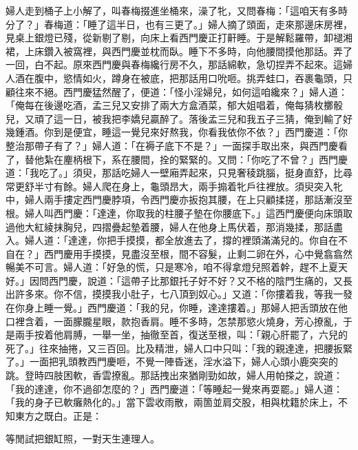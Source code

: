 婦人走到桶子上小解了，叫春梅掇進坐桶來，澡了牝，又問春梅：「這咱天有多時分了？」春梅道：「睡了這半日，也有三更了。」婦人摘了頭面，走來那邊床房裡，見桌上銀燈已殘，從新剔了剔，向床上看西門慶正打鼾睡。于是解鬆羅帶，卸褪湘裙，上床鑽入被窩裡，與西門慶並枕而臥。睡下不多時，向他腰間摸他那話。弄了一回，白不起。原來西門慶與春梅纔行房不久，那話綿軟，急切捏弄不起來。這婦人酒在腹中，慾情如火，蹲身在被底，把那話用口吮咂。挑弄蛙口，吞裹龜頭，只顧往來不絕。西門慶猛然醒了，便道：「怪小淫婦兒，如何這咱纔來？」婦人道：「俺每在後邊吃酒，孟三兒又安排了兩大方盒酒菜，郁大姐唱着，俺每猜枚擲骰兒，又頑了這一日，被我把李嬌兒贏醉了。落後孟三兒和我五子三猜，俺到輸了好幾鍾酒。你到是便宜，睡這一覺兒來好熬我，你看我依你不依？」{}西門慶道：「你整治那帶子有了？」婦人道：「在褥子底下不是？」一面探手取出來，與西門慶看了，替他紮在麈柄根下，系在腰間，拴的緊緊的。又問：「你吃了不曾？」西門慶道：「我吃了。」須臾，那話吃婦人一壁廂弄起來，{}只見奢稜跳腦，挺身直舒，比尋常更舒半寸有餘。婦人爬在身上，龜頭昂大，兩手搧着牝戶往裡放。須臾突入牝中，婦人兩手摟定西門慶脖項，令西門慶亦扳抱其腰，在上只顧揉搓，那話漸沒至根。婦人叫西門慶：「達達，你取我的柱腰子墊在你腰底下。」這西門慶便向床頭取過他大紅綾抹胸兒，四摺疊起墊着腰，婦人在他身上馬伏着，那消幾揉，那話盡入。婦人道：「達達，你把手摸摸，都全放進去了，撐的裡頭滿滿兒的。你自在不自在？」西門慶用手摸摸，見盡沒至根，間不容髮，止剩二卵在外，心中覺翕翕然暢美不可言。婦人道：「好急的慌，只是寒冷，咱不得拿燈兒照着幹，趕不上夏天好。」因問西門慶，說道：「這帶子比那銀托子好不好？又不格的陰門生痛的，又長出許多來。你不信，摸摸我小肚子，七八頂到奴心。」又道：「你摟着我，等我一發在你身上睡一覺。」西門慶道：「我的兒，你睡，達達摟着。」那婦人把舌頭放在他口裡含着，一面朦朧星眼，款抱香肩。睡不多時，怎禁那慾火燒身，芳心撩亂，于是兩手按着他肩膊，一舉一坐，抽徹至首，復送至根，叫：「親心肝罷了，六兒的死了。」往來抽捲，又三百回。比及精泄，婦人口中只叫：「我的親達達，把腰扳緊了。」一面把乳頭教西門慶咂，不覺一陣昏迷，淫水溢下，婦人心頭小鹿突突的跳。登時四肢困軟，香雲撩亂。那話拽出來猶剛勁如故，婦人用帕搽之，說道：「我的達達，你不過卻怎麼的？」西門慶道：「等睡起一覺來再耍罷。」婦人道：「我的身子已軟癱熱化的。」{}當下雲收雨散，兩箇並肩交股，相與枕籍於床上，不知東方之既白。正是：

\begin{myquote}
等閒試把銀缸照，一對天生連理人。
\end{myquote}

